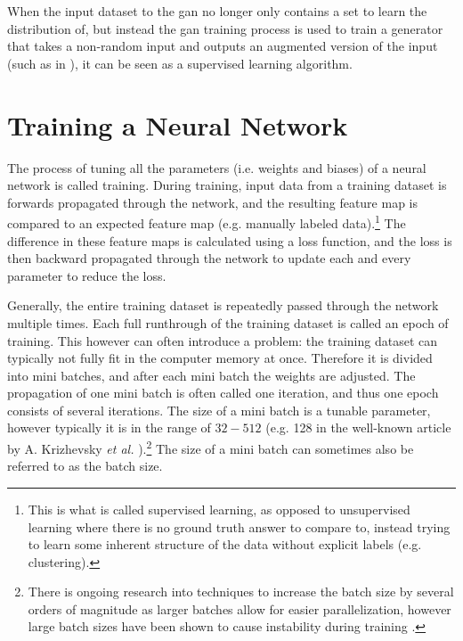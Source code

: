 When the input dataset to the \gls{gan} no longer only contains a set to learn the distribution of, but instead the \gls{gan} training process is used to train a generator that takes a non-random input and outputs an augmented version of the input (such as in \cite{liu2020tomogan}), it can be seen as a supervised learning algorithm.

\section{Training a Neural Network}
The process of tuning all the parameters (i.e. weights and biases) of a neural network is called training. During training, input data from a training dataset is forwards propagated through the network, and the resulting feature map is compared to an expected feature map (e.g. manually labeled data).\footnote{This is what is called supervised learning, as opposed to unsupervised learning where there is no ground truth answer to compare to, instead trying to learn some inherent structure of the data without explicit labels (e.g. clustering). } The difference in these feature maps is calculated using a loss function, and the loss is then backward propagated through the network to update each and every parameter to reduce the loss. 


Generally, the entire training dataset is repeatedly passed through the network multiple times. Each full runthrough of the training dataset is called an epoch of training. This however can often introduce a problem: the training dataset can typically not fully fit in the computer memory at once. Therefore it is divided into mini batches, and after each mini batch the weights are adjusted. The propagation of one mini batch is often called one iteration, and thus one epoch consists of several iterations. The size of a mini batch is a tunable parameter, however typically it is in the range of $32-512$ (e.g. 128 in the well-known article by A. Krizhevsky \textit{et al.} \cite{alexnet}).\footnote{There is ongoing research into techniques to increase the batch size by several orders of magnitude as larger batches allow for easier parallelization, however large batch sizes have been shown to cause instability during training \cite{you2017large}. } The size of a mini batch can sometimes also be referred to as the batch size. 


